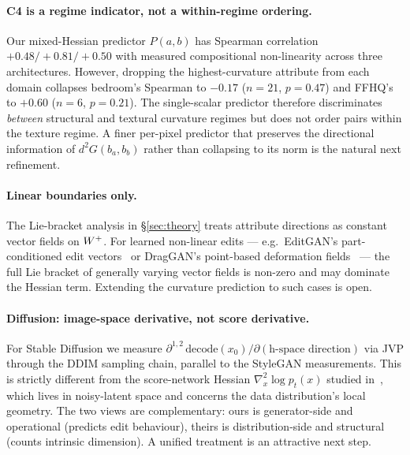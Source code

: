 
\paragraph{C4 is a regime indicator, not a within-regime ordering.}
Our mixed-Hessian predictor $P(a,b)$ has Spearman correlation
$+0.48 / +0.81 / +0.50$ with measured compositional non-linearity
across three architectures. However, dropping the highest-curvature
attribute from each domain collapses bedroom's Spearman to $-0.17$
($n=21$, $p=0.47$) and FFHQ's to $+0.60$ ($n=6$, $p=0.21$). The
single-scalar predictor therefore discriminates \emph{between}
structural and textural curvature regimes but does not order pairs
within the texture regime. A finer per-pixel predictor that
preserves the directional information of $d^2 G(b_a, b_b)$ rather
than collapsing to its norm is the natural next refinement.

\paragraph{Linear boundaries only.}
The Lie-bracket analysis in \S\ref{sec:theory} treats attribute
directions as constant vector fields on $W^+$. For learned non-linear
edits --- e.g.\ EditGAN's part-conditioned edit
vectors~\cite{Ling2021EditGAN} or DragGAN's
point-based deformation fields~\cite{Pan2023DragGAN} --- the full Lie
bracket of generally varying vector fields is non-zero and may
dominate the Hessian term. Extending the curvature prediction to such
cases is open.

\paragraph{Diffusion: image-space derivative, not score derivative.}
For Stable Diffusion we measure $\partial^{1,2}\, \mathrm{decode}(x_0)
/\partial(\text{h-space direction})$ via JVP through the DDIM
sampling chain, parallel to the StyleGAN measurements. This is
strictly different from the score-network Hessian
$\nabla^2_x \log p_t(x)$ studied
in~\cite{Stanczuk2024IntrinsicDim, Park2023Riemannian}, which lives
in noisy-latent space and concerns the data distribution's local
geometry. The two views are complementary: ours is generator-side
and operational (predicts edit behaviour), theirs is
distribution-side and structural (counts intrinsic dimension). A
unified treatment is an attractive next step.

